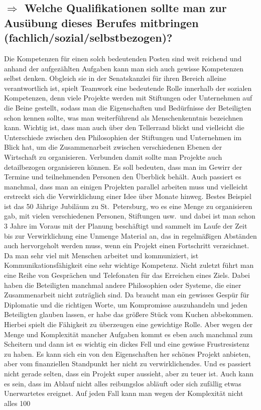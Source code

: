 \documentclass[12pt,headsepline,a4paper]{scrartcl}
\newcommand\quest[1]{\subsection*{$\Rightarrow$ #1}}
\begin{document}
\quest{Welche Qualifikationen sollte man zur Ausübung dieses Berufes mitbringen (fachlich/sozial/selbstbezogen)?}
Die Kompetenzen für einen solch bedeutenden Posten sind weit reichend und anhand der aufgezählten Aufgaben kann man sich auch gewisse Kompetenzen selbst denken.
Obgleich sie in der Senatskanzlei für ihren Bereich alleine verantwortlich ist, spielt Teamwork eine bedeutende Rolle innerhalb der sozialen Kompetenzen, denn viele Projekte werden mit Stiftungen oder Unternehmen auf die Beine gestellt, sodass man die Eigenschaften und Bedürfnisse der Beteiligten schon kennen sollte, was man weiterführend als Menschenkenntnis bezeichnen kann. Wichtig ist, dass man auch über den Tellerrand blickt und vielleicht die Unterschiede zwischen den Philosophien der Stiftungen und Unternehmen im Blick hat, um die Zusammenarbeit zwischen verschiedenen Ebenen der Wirtschaft zu organisieren.
Verbunden damit sollte man Projekte auch detailbezogen organisieren können. Es soll bedeuten, dass man im Gewirr der Termine und teilnehmenden Personen den Überblick behält. Auch passiert es manchmal, dass man an einigen Projekten parallel arbeiten muss und vielleicht erstreckt sich die Verwirklichung einer Idee über Monate hinweg.
Bestes Beispiel ist das 50 Jährige Jubiläum zu St.\ Petersburg, wo es eine Menge zu organisieren gab, mit vielen verschiedenen Personen, Stiftungen usw.\ und dabei ist man schon 3 Jahre im Voraus mit der Planung beschäftigt und sammelt im Laufe der Zeit bis zur Verwirklichung eine Unmenge Material an, das in regelmäßigen Abständen auch hervorgeholt werden muss, wenn ein Projekt einen Fortschritt verzeichnet.
Da man sehr viel mit Menschen arbeitet und kommuniziert, ist Kommunikationsfähigkeit eine sehr wichtige Kompetenz. Nicht zuletzt führt man eine Reihe von Gesprächen und Telefonaten für das Erreichen eines Ziels. Dabei haben die Beteiligten manchmal andere Philosophien oder Systeme, die einer Zusammenarbeit nicht zuträglich sind. Da braucht man ein gewisses Gespür für Diplomatie und die richtigen Worte, um Kompromisse auszuhandeln und jeden Beteiligten glauben lassen, er habe das größere Stück vom Kuchen abbekommen. Hierbei spielt die Fähigkeit zu überzeugen eine gewichtige Rolle.
Aber wegen der Menge und Komplexität mancher Aufgaben kommt es eben auch manchmal zum  Scheitern und dann ist es wichtig ein dickes Fell und eine gewisse Frustresistenz zu haben. Es kann sich ein von den Eigenschaften her schönes Projekt anbieten, aber vom finanziellen Standpunkt her nicht zu verwirklichendes. Und es passiert nicht gerade selten, dass ein Projekt super aussieht, aber zu teuer ist. Auch kann es sein, dass im Ablauf nicht alles reibungslos abläuft oder sich zufällig etwas Unerwartetes ereignet. Auf jeden Fall kann man wegen der Komplexität nicht alles 100%
\end{document}
